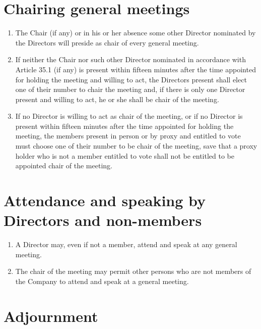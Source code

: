\documentclass[a4paper,12pt]{article}
\begin{document}
\section{Chairing general meetings}

\begin{enumerate}
  \item The Chair (if any) or in his or her absence some other Director nominated by the Directors will preside as chair of every general meeting.
  \item If neither the Chair nor such other Director nominated in accordance with Article 35.1 (if any) is present within fifteen minutes after the time appointed for holding the meeting and willing to act, the Directors present shall elect one of their number to chair the meeting and, if there is only one Director present and willing to act, he or she shall be chair of the meeting.
  \item If no Director is willing to act as chair of the meeting, or if no Director is present within fifteen minutes after the time appointed for holding the meeting, the members present in person or by proxy and entitled to vote must choose one of their number to be chair of the meeting, save that a proxy holder who is not a member entitled to vote shall not be entitled to be appointed chair of the meeting.
\end{enumerate}

\section{Attendance and speaking by Directors and non-members}

\begin{enumerate}
  \item A Director may, even if not a member, attend and speak at any general meeting.
  \item The chair of the meeting may permit other persons who are not members of the Company to attend and speak at a general meeting.
\end{enumerate}

\section{Adjournment}
\end{document}
